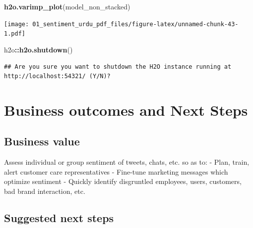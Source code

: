 \documentclass[
]{article}
\newenvironment{Shaded}{\begin{snugshade}}{\end{snugshade}}
\newcommand{\KeywordTok}[1]{\textcolor[rgb]{0.13,0.29,0.53}{\textbf{#1}}}
\newcommand{\NormalTok}[1]{#1}
\newcommand{\OperatorTok}[1]{\textcolor[rgb]{0.81,0.36,0.00}{\textbf{#1}}}
\begin{document}
\begin{Shaded}
\begin{Highlighting}[]
\KeywordTok{h2o.varimp\_plot}\NormalTok{(model\_non\_stacked)}
\end{Highlighting}
\end{Shaded}

\texttt{[image: 01\_sentiment\_urdu\_pdf\_files/figure-latex/unnamed-chunk-43-1.pdf]}

\begin{Shaded}
\begin{Highlighting}[]
\NormalTok{h2o}\OperatorTok{::}\KeywordTok{h2o.shutdown}\NormalTok{()}
\end{Highlighting}
\end{Shaded}

\begin{verbatim}
## Are you sure you want to shutdown the H2O instance running at http://localhost:54321/ (Y/N)?
\end{verbatim}

\hypertarget{business-outcomes-and-next-steps}{%
\section{Business outcomes and Next
Steps}\label{business-outcomes-and-next-steps}}

\hypertarget{business-value}{%
\subsection{Business value}\label{business-value}}

Assess individual or group sentiment of tweets, chats, etc. so as to: -
Plan, train, alert customer care representatives - Fine-tune marketing
messages which optimize sentiment - Quickly identify disgruntled
employees, users, customers, bad brand interaction, etc.

\hypertarget{suggested-next-steps}{%
\subsection{Suggested next steps}\label{suggested-next-steps}}
\end{document}
